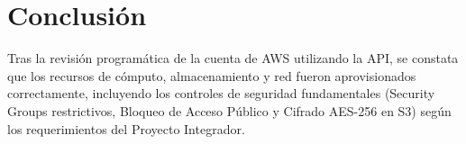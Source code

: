 \documentclass[12pt,a4paper]{article}
\begin{document}
\section{Conclusión}
Tras la revisión programática de la cuenta de AWS utilizando la API, se constata que los recursos de cómputo, almacenamiento y red fueron aprovisionados correctamente, incluyendo los controles de seguridad fundamentales (Security Groups restrictivos, Bloqueo de Acceso Público y Cifrado AES-256 en S3) según los requerimientos del Proyecto Integrador.
\end{document}
